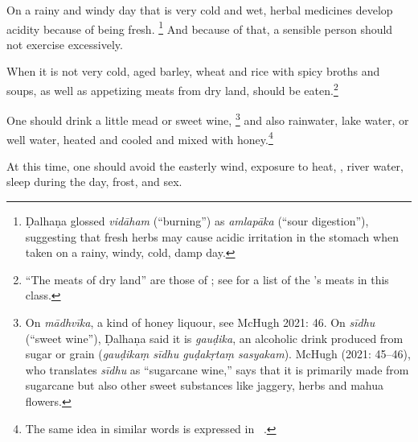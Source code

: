 \begin{translation}
	\item [8cd--9]
	On a rainy and windy day that is very cold and wet, %
	herbal medicines develop acidity because of being fresh.%
	\footnote{Ḍalhaṇa \citep[809]{vulgate}  glossed \emph{vidāham} (“burning”) as \emph{amlapāka} (“sour digestion”), suggesting that fresh herbs may cause acidic irritation in the stomach when taken on a rainy, windy, cold, damp day.}
	And because of that, a sensible person should not exercise excessively.

	\item [10] %
	When it is not very cold, aged barley, wheat and rice with spicy broths and soups, as well as appetizing meats from dry land,
	should be eaten.\footnote{``The meats of dry land'' are those of ; see \cite[fig.\,5, p.\,52]{zimm-1999} for a list of the \SS's meats in this class.\label{jaṅgala}}

	\item [11] %
	One should drink a little mead or sweet wine,%
	\footnote{On \emph{mādhvīka}, a kind of honey liquour, see McHugh 2021: 46. On \emph{sīdhu} (“sweet wine”), Ḍalhaṇa \citep[778]{vulgate} said it is \emph{gauḍika}, an alcoholic drink produced from sugar or grain (\emph{gauḍikaṃ sīdhu guḍakṛtaṃ sasyakam}). McHugh (2021: 45–46), who translates \emph{sīdhu} as “sugarcane wine,” says that it is primarily made from sugarcane but also other sweet substances like jaggery, herbs and mahua flowers.}
	and also rainwater, lake water, or well water, heated and cooled and mixed with honey.\footnote{The same idea in similar words is expressed in \CS\ .}

	\item[12] %
	At this time, %
	one should avoid the easterly wind, exposure to  heat, , river water, sleep during the day, frost, and sex.


\end{translation}
